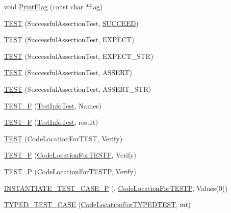 \begin{DoxyCompactItemize}
\item 
void \hyperlink{namespacetesting_a9863402455bfcf9be5fc0b1453a6d97d}{Print\+Flag} (const char $\ast$flag)
\item 
\hyperlink{namespacetesting_ae0cbea692840c88ab0b03285eb69ac97}{T\+E\+ST} (Successful\+Assertion\+Test, \hyperlink{gtest_8h_a75adcdf89f69b0b615e395daafc315af}{S\+U\+C\+C\+E\+ED})
\item 
\hyperlink{namespacetesting_af6c8f998f934372e5687d3998068e5e4}{T\+E\+ST} (Successful\+Assertion\+Test, E\+X\+P\+E\+CT)
\item 
\hyperlink{namespacetesting_a9b1e4b53f277d25e6d6413a0004481bb}{T\+E\+ST} (Successful\+Assertion\+Test, E\+X\+P\+E\+C\+T\+\_\+\+S\+TR)
\item 
\hyperlink{namespacetesting_afbe4c8233faff6eba04902b3cb041632}{T\+E\+ST} (Successful\+Assertion\+Test, A\+S\+S\+E\+RT)
\item 
\hyperlink{namespacetesting_a83dfac108c207258287b9f7aa9171e8a}{T\+E\+ST} (Successful\+Assertion\+Test, A\+S\+S\+E\+R\+T\+\_\+\+S\+TR)
\item 
\hyperlink{namespacetesting_acd53db89097aba1468724d6446069b1e}{T\+E\+S\+T\+\_\+F} (\hyperlink{classtesting_1_1_test_info_test}{Test\+Info\+Test}, Names)
\item 
\hyperlink{namespacetesting_ab00e29c00b3e29cdfa21d23b79dd3776}{T\+E\+S\+T\+\_\+F} (\hyperlink{classtesting_1_1_test_info_test}{Test\+Info\+Test}, result)
\item 
\hyperlink{namespacetesting_af597d0ad4de0197141b78e9c1035e491}{T\+E\+ST} (Code\+Location\+For\+T\+E\+ST, Verify)
\item 
\hyperlink{namespacetesting_a782ec43081903a0aaa6d009218eba2a8}{T\+E\+S\+T\+\_\+F} (\hyperlink{classtesting_1_1_code_location_for_t_e_s_t_f}{Code\+Location\+For\+T\+E\+S\+TF}, Verify)
\item 
\hyperlink{namespacetesting_af05768b7e2f14652d2c4f274ba1a5544}{T\+E\+S\+T\+\_\+P} (\hyperlink{classtesting_1_1_code_location_for_t_e_s_t_p}{Code\+Location\+For\+T\+E\+S\+TP}, Verify)
\item 
\hyperlink{namespacetesting_a5b049e97e9082df909e4a0f740ff5d02}{I\+N\+S\+T\+A\+N\+T\+I\+A\+T\+E\+\_\+\+T\+E\+S\+T\+\_\+\+C\+A\+S\+E\+\_\+P} (, \hyperlink{classtesting_1_1_code_location_for_t_e_s_t_p}{Code\+Location\+For\+T\+E\+S\+TP}, Values(0))
\item 
\hyperlink{namespacetesting_af0459cc6cdfbbae821caf802c7f2bb72}{T\+Y\+P\+E\+D\+\_\+\+T\+E\+S\+T\+\_\+\+C\+A\+SE} (\hyperlink{classtesting_1_1_code_location_for_t_y_p_e_d_t_e_s_t}{Code\+Location\+For\+T\+Y\+P\+E\+D\+T\+E\+ST}, int)

\end{DoxyCompactItemize}
